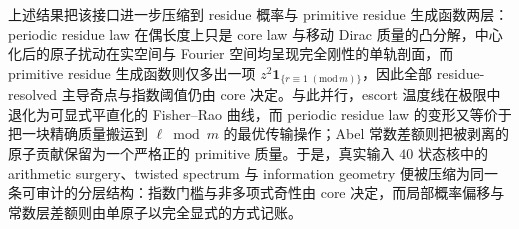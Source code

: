 上述结果把该接口进一步压缩到 residue 概率与 primitive residue 生成函数两层：periodic residue law 在偶长度上只是 core law 与移动 Dirac 质量的凸分解，中心化后的原子扰动在实空间与 Fourier 空间均呈现完全刚性的单轨剖面，而 primitive residue 生成函数则仅多出一项 \(z^2\mathbf 1_{\{r\equiv 1\;(\mathrm{mod}\,m)\}}\)，因此全部 residue-resolved 主导奇点与指数阈值仍由 core 决定。与此并行，escort 温度线在极限中退化为可显式平直化的 Fisher--Rao 曲线，而 periodic residue law 的变形又等价于把一块精确质量搬运到 \(\ell\bmod m\) 的最优传输操作；Abel 常数差额则把被剥离的原子贡献保留为一个严格正的 primitive 质量。于是，真实输入 \(40\) 状态核中的 arithmetic surgery、twisted spectrum 与 information geometry 便被压缩为同一条可审计的分层结构：指数门槛与非多项式奇性由 core 决定，而局部概率偏移与常数层差额则由单原子以完全显式的方式记账。

\endinput
